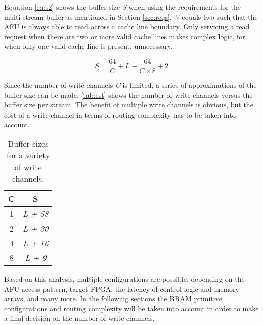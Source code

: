 Equation \ref{eq:s2} shows the buffer size \textit{S} when using the requirements for the multi-stream buffer as mentioned in Section \ref{sec:reqs}. \textit{V} equals two such that the AFU is always able to read across a cache line boundary. Only servicing a read request when there are two or more valid cache lines makes complex logic, for when only one valid cache line is present, unnecessary.

\begin{equation}
  S = \frac{64}{C} + L - \frac{64}{C \times 8} + 2
  \label{eq:s2}
\end{equation}

Since the number of write channels \textit{C} is limited, a series of approximations of the buffer size can be made. \autoref{tab:est} shows the number of write channels versus the buffer size per stream. The benefit of multiple write channels is obvious, but the cost of a write channel in terms of routing complexity has to be taken into account.

\begin{table}[H]
  \centering
  \caption{Buffer sizes for a variety of write channels.}
  \label{tab:est}
  \begin{tabular}{ c | c }
    \textbf{C} & \textbf{S} \\ \hline
    1 & \textit{L + 58} \\
    2 & \textit{L + 30} \\
    4 & \textit{L + 16} \\
    8 & \textit{L + 9} \\
  \end{tabular}
\end{table}

Based on this analysis, multiple configurations are possible, depending on the AFU access pattern, target FPGA, the latency of control logic and memory arrays, and many more. In the following sections the BRAM primitive configurations and routing complexity will be taken into account in order to make a final decision on the number of write channels.


